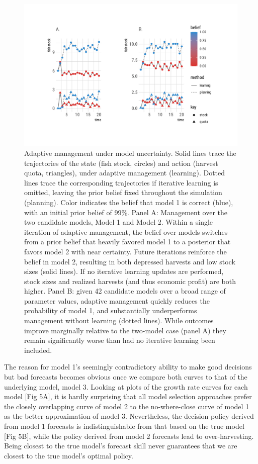 \documentclass[3p]{elsarticle} %
\begin{document}
\begin{figure}
\centering
\includegraphics{manuscript_files/figure-latex/figure4-1.pdf}
\caption{Adaptive management under model uncertainty. Solid lines trace
the trajectories of the state (fish stock, circles) and action (harvest
quota, triangles), under adaptive management (learning). Dotted lines
trace the corresponding trajectories if iterative learning is omitted,
leaving the prior belief fixed throughout the simulation (planning).
Color indicates the belief that model 1 is correct (blue), with an
initial prior belief of 99\%. Panel A: Management over the two candidate
models, Model 1 and Model 2. Within a single iteration of adaptive
management, the belief over models switches from a prior belief that
heavily favored model 1 to a posterior that favors model 2 with near
certainty. Future iterations reinforce the belief in model 2, resulting
in both depressed harvests and low stock sizes (solid lines). If no
iterative learning updates are performed, stock sizes and realized
harvests (and thus economic profit) are both higher. Panel B: given 42
candidate models over a broad range of parameter values, adaptive
management quickly reduces the probability of model 1, and substantially
underperforms management without learning (dotted lines). While outcomes
improve marginally relative to the two-model case (panel A) they remain
significantly worse than had no iterative learning been included.}
\end{figure}

The reason for model 1's seemingly contradictory ability to make good
decisions but bad forecasts becomes obvious once we compare both curves
to that of the underlying model, model 3. Looking at plots of the growth
rate curves for each model {[}Fig 5A{]}, it is hardly surprising that
all model selection approaches prefer the closely overlapping curve of
model 2 to the no-where-close curve of model 1 as the better
approximation of model 3. Nevertheless, the decision policy derived from
model 1 forecasts is indistinguishable from that based on the true model
{[}Fig 5B{]}, while the policy derived from model 2 forecasts lead to
over-harvesting. Being closest to the true model's forecast skill never
guarantees that we are closest to the true model's optimal policy.
\end{document}
